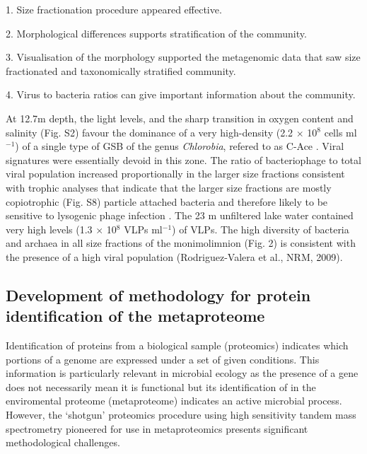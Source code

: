 1. Size fractionation procedure appeared effective.

2. Morphological differences supports stratification of the community.

3. Visualisation of the morphology supported the metagenomic data that saw size fractionated and taxonomically stratified community.

4. Virus to bacteria ratios can give important information about the community.

At 12.7m depth, the light levels, and the sharp transition in oxygen content and salinity (Fig. S2) favour the dominance of a very high-density (2.2 $\times$ 10$^8$ cells ml$^{-1}$) of a single type of \ac{GSB} of the genus \emph{Chlorobia}, refered to as C-Ace \cite{Ng2010a}. 
Viral signatures were essentially devoid in this zone. 
The ratio of bacteriophage to total viral population increased proportionally in the larger size fractions consistent with trophic analyses that indicate that the larger size fractions are mostly copiotrophic (Fig. S8) particle attached bacteria and therefore likely to be sensitive to lysogenic phage infection \cite{Lauro2009}. 
The 23 m unfiltered lake water contained very high levels (1.3 $\times$ 10$^8$ \acp{VLP} ml$^{-1}$) of \acp{VLP}. 
The high diversity of bacteria and archaea in all size fractions of the monimolimnion (Fig. 2) is consistent with the presence of a high viral population (Rodriguez-Valera et al., NRM, 2009).



\subsection[Development of methodology for protein identification of the metaproteome]{Development of methodology for protein identification of the metaproteome}

Identification of proteins from a biological sample (proteomics) indicates which portions of a genome are expressed under a set of given conditions.
This information is particularly relevant in microbial ecology as the presence of a gene does not necessarily mean it is functional but its identification of in the enviromental proteome (metaproteome) indicates an active microbial process.
However, the `shotgun' proteomics procedure using high sensitivity tandem mass spectrometry pioneered for use in metaproteomics \cite{Ram2005} presents significant methodological challenges.

